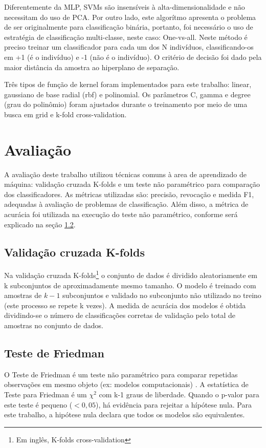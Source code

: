 \documentclass[conference]{IEEEtran}
\begin{document}
Diferentemente da MLP, SVMs são insensíveis à alta-dimensionalidade e não necessitam do uso de PCA. Por outro lado, este algorítmo apresenta o problema de ser originalmente para classificação binária, portanto, foi necessário o uso de estratégia de classificação multi-classe, neste caso: One-vs-all. Neste método é preciso treinar um classificador para cada um dos N indivíduos, classificando-os em +1 (é o indivíduo) e -1 (não é o indivíduo). O critério de decisão foi dado pela maior distância da amostra ao hiperplano de separação.

Três tipos de função de kernel foram implementados para este trabalho: linear, gaussiano de base radial (rbf) e polinomial. Os parâmetros C, gamma e degree (grau do polinômio) foram ajustados durante o treinamento por meio de uma busca em grid e k-fold cross-validation.

\section{Avaliação}
A avaliação deste trabalho utilizou técnicas comuns à area de aprendizado de máquina: validação cruzada K-folds e um teste não paramétrico para comparação dos classificadores. As métricas utilizadas são: precisão, revocação e medida F1, adequadas à avaliação de problemas de classificação. Além disso, a métrica de acurácia foi utilizada na execução do teste não paramétrico, conforme será explicado na seção \ref{sec:friedman}.

\subsection{Validação cruzada K-folds}
Na validação cruzada K-folds\footnote{Em inglês, K-folds cross-validation} o conjunto de dados é dividido aleatoriamente em k subconjuntos de aproximadamente mesmo tamanho. O modelo é treinado com amostras de $k-1$ subconjuntos e validado no subconjunto não utilizado no treino (este processo se repete k vezes). A medida de acurácia dos modelos é obtida dividindo-se o número de classificações corretas de validação pelo total de amostras no conjunto de dados.

\subsection{Teste de Friedman} \label{sec:friedman}
O Teste de Friedman é um teste não paramétrico para comparar repetidas observações em mesmo objeto (ex: modelos computacionais) \cite{demvsar2006statistical,settouti2016statistical}. A estatística de Teste para Friedman é um $\chi^2$ com k-1 graus de liberdade. Quando o p-valor para este teste é pequeno ($< 0,05$), há evidência para rejeitar a hípótese nula. Para este trabalho, a hipótese nula declara que todos os modelos são equivalentes.
\end{document}
